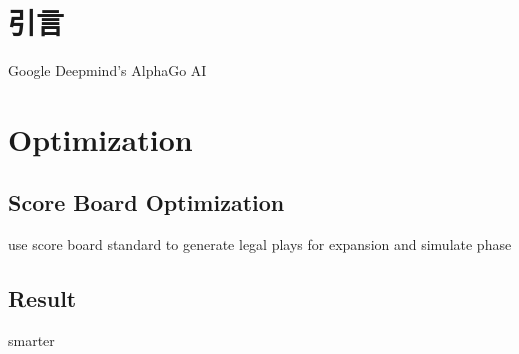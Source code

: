 \section{引言}
Google Deepmind's AlphaGo AI\cite{DBLP:journals/nature/SilverHMGSDSAPL16}\cite{silver2017mastering}
\newpage

\section{Optimization}
\subsection{Score Board Optimization}
use score board standard to generate legal plays for expansion and simulate phase
\subsection{Result}
smarter
\newpage



\newpage


